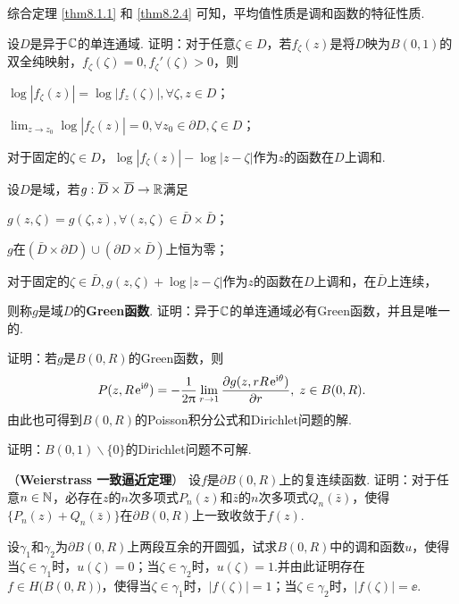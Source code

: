 综合定理 \ref{thm8.1.1} 和 \ref{thm8.2.4} 可知，平均值性质是调和函数的特征性质.
\begin{xiti}\hypertarget{xiti8.2}{}
  \item 设$D$是异于$\mathbb C$的单连通域. 证明：对于任意$\zeta\in D$，若$f_\zeta(z)$是将$D$映为$B(0,1)$的双全纯映射，$f_\zeta(\zeta)=0,f_\zeta'(\zeta)>0$，则
    \begin{enuma}
      \item $\log|f_\zeta(z)|=\log|f_z(\zeta)|,\forall\zeta,z\in D$；
      \item $\lim_{z\to z_0}\log|f_\zeta(z)|=0,\forall z_0\in\partial D,\zeta\in D$；
      \item 对于固定的$\zeta\in D$，$\log|f_\zeta(z)|-\log|z-\zeta|$作为$z$的函数在$D$上调和.
    \end{enuma}
  \item 设$D$是域，若$g:{}\mkern1mu\overline{\mkern-1muD}\times {}\mkern1mu\overline{\mkern-1muD}\to\mathbb R$满足
    \begin{enuma}
      \item $g(z,\zeta)=g(\zeta,z),\forall (z,\zeta)\in\bar D\times\bar D$；
      \item $g$在$(\bar D\times\partial D)\cup(\partial D\times\bar D)$上恒为零；
      \item 对于固定的$\zeta\in\bar D,g(z,\zeta)+\log|z-\zeta|$作为$z$的函数在$D$上调和，在$\bar D$上连续，
    \end{enuma}
    则称$g$是域$D$的\textbf{Green函数}. 证明：异于$\mathbb C$的单连通域必有Green函数，并且是唯一的.
  \item 证明：若$g$是$B(0,R)$的Green函数，则
    \[
      P(z,R\operatorname{\!\!\;\mathrm e}^{\mathrm i\theta}) = -\frac1{2\uppi}\lim_{r\to1}\frac{\partial g(z,rR\operatorname{\!\!\;\mathrm e}^{\mathrm i\theta})}{\partial r}
      ,\;z\in B(0,R).
    \]
    由此也可得到$B(0,R)$的Poisson积分公式和Dirichlet问题的解.
  \item 证明：$B(0,1)\backslash\{0\}$的Dirichlet问题不可解.
  \item （\textbf{Weierstrass 一致逼近定理}）
    设$f$是$\partial B(0,R)$上的复连续函数. 证明：对于任意$n\in\mathbb N$，必存在$z$的$n$次多项式$P_n(z)$和$\bar z$的$n$次多项式$Q_n(\bar z)$，使得$\{P_n(z)+Q_n(\bar z)\}$在$\partial B(0,R)$上一致收敛于$f(z)$.
  \item \hypertarget{xiti8.2.6}{} 设$\gamma_1$和$\gamma_2$为$\partial B(0,R)$上两段互余的开圆弧，试求$B(0,R)$中的调和函数$u$，使得当$\zeta\in\gamma_1$时，$u(\zeta)=0$；当$\zeta\in\gamma_2$时，$u(\zeta)=1$.并由此证明存在$f\in H\big(B(0,R)\big)$，使得当$\zeta\in\gamma_1$时，$|f(\zeta)|=1$；当$\zeta\in\gamma_2$时，$|f(\zeta)|=\ee$.
\end{xiti}

